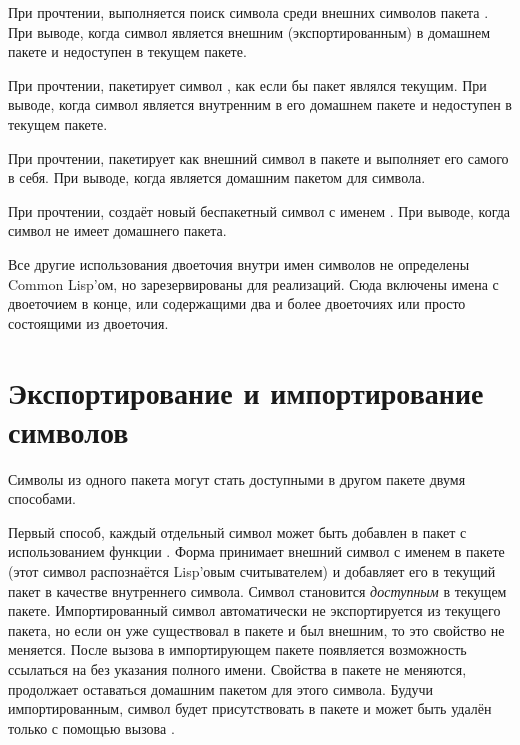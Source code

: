 \begin{flushdesc}
\item[\cd{foo:bar}] При прочтении, выполняется поиск символа 
  среди внешних символов пакета . При выводе, когда символ
   является внешним (экспортированным) в домашнем пакете
   и недоступен в текущем пакете.

\item[\cd{foo::bar}] При прочтении, пакетирует символ , как
  если бы пакет  являлся текущим. При выводе, когда символ
   является внутренним в его домашнем пакете  и
  недоступен в текущем пакете.

\item[\cd{:bar}] При прочтении, пакетирует  как внешний символ
  в пакете  и выполняет его самого в себя. При выводе,
  когда  является домашним пакетом для символа.

\item[\cd{\#:bar}] При прочтении, создаёт новый беспакетный символ с
  именем .  При выводе, когда символ  не имеет
  домашнего пакета.
\end{flushdesc}

Все другие использования двоеточия внутри имен символов не определены Common
Lisp'ом, но зарезервированы для реализаций. Сюда включены имена с двоеточием в
конце, или содержащими два и более двоеточиях или просто состоящими из
двоеточия.

\section{Экспортирование и импортирование символов} 
\label{EXPORT-IMPORT-SECTION}

Символы из одного пакета могут стать доступными в другом пакете двумя способами.

Первый способ, каждый отдельный символ может быть добавлен в пакет с
использованием функции . Форма  принимает внешний символ с именем  в
пакете  (этот символ распознаётся Lisp'овым считывателем) и
добавляет его в текущий пакет в качестве внутреннего символа. Символ
становится \emph{доступным} в текущем пакете. Импортированный символ
автоматически не экспортируется из текущего пакета, но если он уже
существовал в пакете и был внешним, то это свойство не меняется. После
вызова  в импортирующем пакете появляется возможность
ссылаться на  без указания полного имени. Свойства
 в пакете  не меняются, 
продолжает оставаться домашним пакетом для этого символа. Будучи
импортированным, символ будет присутствовать в пакете и может быть
удалён только с помощью вызова .

